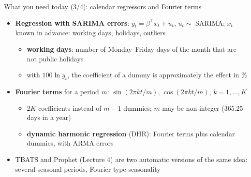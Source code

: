 \begin{frame}{What you need today (3/4): calendar regressors and Fourier terms}
\itemsize{\small}
\begin{itemize}
    \item \textbf{Regression with SARIMA errors}: $y_t = \beta^\top x_t + u_t$, $u_t \sim$ SARIMA; $x_t$ known in advance: working days, holidays, outliers
    \begin{itemize}
        \item \textbf{working days}: number of Monday--Friday days of the month that are not public holidays
        \item with $100\ln y_t$, the coefficient of a dummy is approximately the effect in \%
    \end{itemize}
    \item \textbf{Fourier terms} for a period $m$: $\sin(2\pi kt/m)$, $\cos(2\pi kt/m)$, $k = 1, \dots, K$
    \begin{itemize}
        \item $2K$ coefficients instead of $m - 1$ dummies; $m$ may be non-integer ($365.25$ days in a year)
        \item \textbf{dynamic harmonic regression} (DHR): Fourier terms plus calendar dummies, with ARMA errors
    \end{itemize}
    \item TBATS and Prophet (Lecture 4) are two automatic versions of the same idea: several seasonal periods, Fourier-type seasonality
\end{itemize}
\end{frame}

